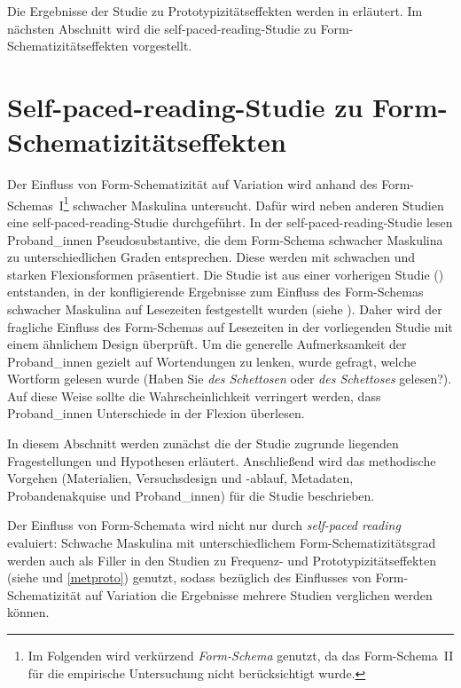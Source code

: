 Die Ergebnisse der Studie zu Prototypizitätseffekten werden in  erläutert. Im nächsten Abschnitt wird die self-paced-reading-Studie zu Form-Sche\-ma\-ti\-zi\-täts\-ef\-fek\-ten vorgestellt.

\section{Self-paced-reading-Studie zu Form-Schematizitätseffekten}
\label{methschema}

Der Einfluss von Form-Schematizität auf Variation wird anhand des Form-Sche\-mas~I\footnote{Im Folgenden wird verkürzend \textit{Form-Schema} genutzt, da das Form-Schema~II für die empirische Untersuchung nicht berücksichtigt wurde.} schwacher Maskulina untersucht. Dafür wird neben anderen Studien eine self-paced-reading-Studie durchgeführt. In der self-paced-reading-Studie lesen Proband\_innen Pseudosubstantive, die dem Form-Schema schwacher Maskulina zu unterschiedlichen Graden entsprechen. Diese werden mit schwachen und starken Flexionsformen präsentiert. Die Studie ist aus einer vorherigen Studie (\cite{Schmitt.2019}) entstanden, in der konfligierende Ergebnisse zum Einfluss des Form-Schemas schwacher Maskulina auf Lesezeiten festgestellt wurden (siehe ). Daher wird der fragliche Einfluss des Form-Schemas auf Lesezeiten in der vorliegenden Studie mit einem ähnlichem Design überprüft. Um die generelle Aufmerksamkeit der Proband\_innen gezielt auf Wortendungen zu lenken, wurde gefragt, welche Wortform gelesen wurde (Haben Sie \textit{des Schettosen} oder \textit{des Schettoses} gelesen?). Auf diese Weise sollte die Wahrscheinlichkeit verringert werden, dass Proband\_innen Unterschiede in der Flexion überlesen. 


In diesem Abschnitt werden zunächst die der Studie zugrunde liegenden Fragestellungen und Hypothesen erläutert. Anschließend wird das methodische Vorgehen (Materialien, Versuchsdesign und -ablauf, Metadaten, Probandenakquise und Proband\_innen) für die Studie beschrieben.  


Der Einfluss von Form-Schemata wird nicht nur durch \textit{self-paced reading} evaluiert: Schwache Maskulina mit unterschiedlichem Form-Schematizitätsgrad werden auch als Filler in den Studien zu Frequenz- und Prototypizitätseffekten  (siehe  und \ref{metproto}) genutzt, sodass bezüglich des Einflusses von Form-Sche\-ma\-ti\-zi\-tät auf Variation die Ergebnisse mehrere Stu\-dien verglichen werden können.

